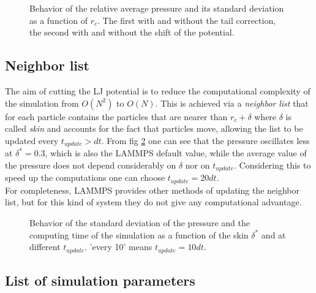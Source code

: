 \documentclass[a4paper, 11pt]{article}
\begin{document}
    \begin{figure}[H]
      \centering
       \hspace{-0.5cm}
      \caption{Behavior of the relative average pressure and its standard deviation as a function of $r_c$. The first with and without the tail correction, the second with and without the shift of the potential.}
      \label{fig:r_c}
    \end{figure}


  \subsection{Neighbor list}
    The aim of cutting the LJ potential is to reduce the computational complexity of the simulation from $O(N^2)$ to $O(N)$. This is achieved via a \emph{neighbor list} that for each particle contains the particles that are nearer than $r_c + \delta$ where $\delta$ is called \emph{skin} and accounts for the fact that particles move, allowing the list to be updated every $t_{update} > dt$.
    From fig \ref{fig:delta} one can see that the pressure oscillates less at $\delta^* = 0.3$, which is also the LAMMPS default value, while the average value of the pressure does not depend considerably on $\delta$ nor on $t_{update}$. Considering this to speed up the computations one can choose $t_{update} = 20 dt$. \\
    For completeness, LAMMPS provides other methods of updating the neighbor list, but for this kind of system they do not give any computational advantage.

    \begin{figure}[H]
      \centering
       \hspace{-0.5cm}
      \caption{Behavior of the standard deviation of the pressure and the computing time of the simulation as a function of the skin $\delta^*$ and at different $t_{update}$. 'every 10' means $t_{update} = 10dt$.}
      \label{fig:delta}
    \end{figure}


  \subsection{List of simulation parameters}
\end{document}
